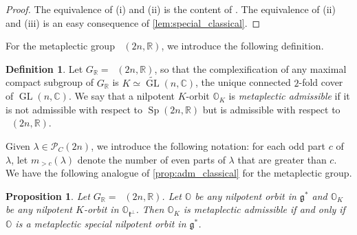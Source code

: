\documentclass[11pt, a4paper]{amsart}
\newcommand{\C}{\mathbb{C}}
\newcommand{\orb}{\mathbb{O}}
\newcommand{\orbk}{\orb_{K}}
\newcommand{\fg}{\mathfrak{g}}
\newcommand{\fk}{\mathfrak{k}}
\newcommand{\fr}{\mathfrak{r}}
\newcommand{\cP}{\mathcal{P}}
\DeclareMathOperator{\Mp}{\widetilde{Sp}}
\newcommand{\Sp}{\operatorname{Sp}}
\newcommand{\R}{\mathbb{R}}
\newcommand{\GR}{G_\R}
\newcommand{\GL}{\operatorname{GL}}
\newtheorem{Prop}[Thm]{Proposition}
\theoremstyle{definition}
\newtheorem{defi}[Thm]{Definition}
\numberwithin{equation}{section}
\begin{document}

\begin{proof}
	The equivalence of (i) and (ii) is the content of \cite[Theorem 2]{Ohta:Adm}. The equivalence of (ii) and (iii) is an easy consequence of \cref{lem:special_classical}.
\end{proof}

For the metaplectic group $\Mp(2n,\R)$, we introduce the following definition.

\begin{defi}
	Let $\GR = \Mp(2n,\R)$, so that the complexification of any maximal compact subgroup of $\GR$ is $K \simeq \widetilde{\GL}(n,\C)$, the unique connected $2$-fold cover of $\GL(n,\C)$. We say that a nilpotent $K$-orbit $\orbk$ is {\it metaplectic admissible} if it is not admissible with respect to $\Sp(2n,\R)$ but is admissible with respect to $\Mp(2n,\R)$.
\end{defi}


Given $\lambda \in \cP_C(2n)$, we introduce the following notation: for each odd part $c$ of $\lambda$, let $m_{>c}(\lambda)$ denote the number of even parts of $\lambda$ that are greater than $c$. We have the following analogue of \cref{prop:adm_classical} for the metaplectic group.

\begin{Prop} \label{prop:metaplectic_adm}
	Let $\GR = \Mp(2n,\R)$. Let $\orb$ be any nilpotent orbit in $\fg^*$ and $\orbk$ be any nilpotent $K$-orbit in $\orb_{\fk^\perp}$. Then $\orbk$ is metaplectic admissible if and only if $\orb$ is a metaplectic special nilpotent orbit in $\fg^*$.
\end{Prop}
\end{document}
